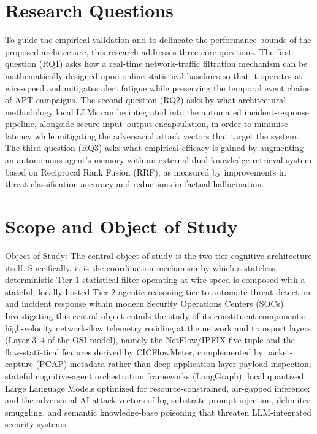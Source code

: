 \section{Research Questions}

To guide the empirical validation and to delineate the performance bounds of the proposed architecture, this research addresses three core questions. The first question (RQ1) asks how a real-time network-traffic filtration mechanism can be mathematically designed upon online statistical baselines so that it operates at wire-speed and mitigates alert fatigue while preserving the temporal event chains of APT campaigns. The second question (RQ2) asks by what architectural methodology local LLMs can be integrated into the automated incident-response pipeline, alongside secure input--output encapsulation, in order to minimise latency while mitigating the adversarial attack vectors that target the system. The third question (RQ3) asks what empirical efficacy is gained by augmenting an autonomous agent's memory with an external dual knowledge-retrieval system based on Reciprocal Rank Fusion (RRF), as measured by improvements in threat-classification accuracy and reductions in factual hallucination.

\section{Scope and Object of Study}

Object of Study: The central object of study is the two-tier cognitive architecture itself. Specifically, it is the coordination mechanism by which a stateless, deterministic Tier-1 statistical filter operating at wire-speed is composed with a stateful, locally hosted Tier-2 agentic reasoning tier to automate threat detection and incident response within modern Security Operations Centers (SOCs). Investigating this central object entails the study of its constituent components: high-velocity network-flow telemetry residing at the network and transport layers (Layer 3--4 of the OSI model), namely the NetFlow/IPFIX five-tuple and the flow-statistical features derived by CICFlowMeter, complemented by packet-capture (PCAP) metadata rather than deep application-layer payload inspection; stateful cognitive-agent orchestration frameworks (LangGraph); local quantized Large Language Models optimized for resource-constrained, air-gapped inference; and the adversarial AI attack vectors of log-substrate prompt injection, delimiter smuggling, and semantic knowledge-base poisoning that threaten LLM-integrated security systems.

